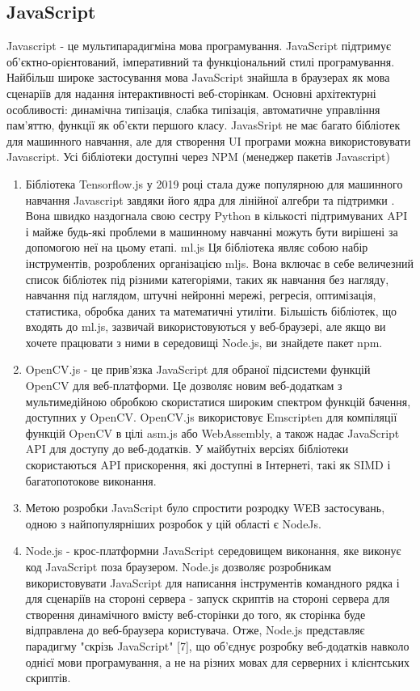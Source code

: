 \subsection{JavaScript}
Javascript - це мультипарадигміна мова програмування. JavaScript підтримує об'єктно-орієнтований, імперативний та функціональний стилі програмування. Найбільш широке застосування мова JavaScript знайшла в браузерах як мова сценаріїв для надання інтерактивності веб-сторінкам. Основні архітектурні особливості: динамічна типізація, слабка типізація, автоматичне управління пам'яттю, функції як об'єкти першого класу. JavasSript не має багато бібліотек для машинного навчання, але для створення UI програми можна використовувати Javascript. Усі бібліотеки доступні через NPM (менеджер пакетів Javascript)
\begin{enumerate}
    \item Бібліотека Tensorflow.js у 2019 році стала дуже популярною для машинного навчання Javascript завдяки його ядра для лінійної алгебри та підтримки . Вона швидко наздогнала свою сестру Python в кількості підтримуваних API і майже будь-які проблеми в машинному навчанні можуть бути вирішені за допомогою неї на цьому етапі.
    ml.js
    Ця бібліотека являє собою набір інструментів, розроблених організацією mljs. Вона включає в себе величезний список бібліотек під різними категоріями, таких як навчання без нагляду, навчання під наглядом, штучні нейронні мережі, регресія, оптимізація, статистика, обробка даних та математичні утиліти.
    Більшість бібліотек, що входять до ml.js, зазвичай використовуються у веб-браузері, але якщо ви хочете працювати з ними в середовищі Node.js, ви знайдете пакет npm.
    \item OpenCV.js - це прив'язка JavaScript для обраної підсистеми функцій OpenCV для веб-платформи. Це дозволяє новим веб-додаткам з мультимедійною обробкою скористатися широким спектром функцій бачення, доступних у OpenCV. OpenCV.js використовує Emscripten для компіляції функцій OpenCV в цілі asm.js або WebAssembly, а також надає JavaScript API для доступу до веб-додатків. У майбутніх версіях бібліотеки скористаються API прискорення, які доступні в Інтернеті, такі як SIMD і багатопотокове виконання.
    \item Метою розробки JavaScript було спростити розродку WEB застосувань, одною з найпопулярніших розробок у цій області є NodeJs.
    \item Node.js - крос-платформни JavaScript середовищем виконання, яке виконує код JavaScript поза браузером. Node.js дозволяє розробникам використовувати JavaScript для написання інструментів командного рядка і для сценаріїв на стороні сервера - запуск скриптів на стороні сервера для створення динамічного вмісту веб-сторінки до того, як сторінка буде відправлена до веб-браузера користувача. Отже, Node.js представляє парадигму "скрізь JavaScript" [7], що об'єднує розробку веб-додатків навколо однієї мови програмування, а не на різних мовах для серверних і клієнтських скриптів.
\end{enumerate}

